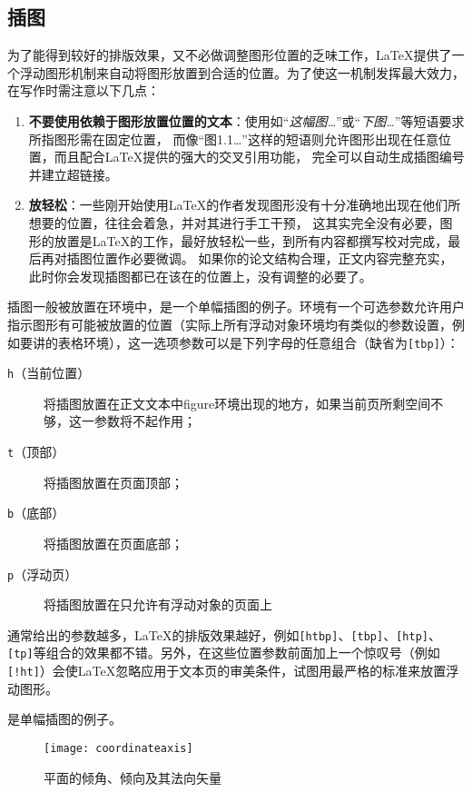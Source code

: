\subsection{插图}
为了能得到较好的排版效果，又不必做调整图形位置的乏味工作，\LaTeX 提供了一个浮动图形机制来自动将图形放置到合适的位置。为了使这一机制发挥最大效力，在写作时需注意以下几点：
\begin{enumerate}
	\item \textbf{不要使用依赖于图形放置位置的文本}：使用如“\emph{这幅图…}”或“\emph{下图…}”等短语要求所指图形需在固定位置，
	      而像“{\kaishu 图1.1…}”这样的短语则允许图形出现在任意位置，而且配合\LaTeX 提供的强大的交叉引用功能，
	      完全可以自动生成插图编号并建立超链接。
	\item \textbf{放轻松}：一些刚开始使用\LaTeX 的作者发现图形没有十分准确地出现在他们所想要的位置，往往会着急，并对其进行手工干预，
	      这其实完全没有必要，图形的放置是\LaTeX 的工作，最好放轻松一些，到所有内容都撰写校对完成，最后再对插图位置作必要微调。
	      如果你的论文结构合理，正文内容完整充实，此时你会发现插图都已在该在的位置上，没有调整的必要了。
\end{enumerate}

插图一般被放置在环境中，是一个单幅插图的例子。环境有一个可选参数允许用户指示图形有可能被放置的位置（实际上所有浮动对象环境均有类似的参数设置，例如要讲的表格环境），这一选项参数可以是下列字母的任意组合（缺省为\texttt{[tbp]}）：
\begin{description}
	\item[\texttt{h}（当前位置）] 将插图放置在正文文本中figure环境出现的地方，如果当前页所剩空间不够，这一参数将不起作用；
	\item[\texttt{t}（顶部）] 将插图放置在页面顶部；
	\item[\texttt{b}（底部）] 将插图放置在页面底部；
	\item[\texttt{p}（浮动页）] 将插图放置在只允许有浮动对象的页面上
\end{description}

通常给出的参数越多，\LaTeX 的排版效果越好，例如\texttt{[htbp]}、\texttt{[tbp]}、\texttt{[htp]}、\texttt{[tp]}等组合的效果都不错。另外，在这些位置参数前面加上一个惊叹号（例如\texttt{[!ht]}）会使\LaTeX 忽略应用于文本页的审美条件，试图用最严格的标准来放置浮动图形。

是单幅插图的例子。

\begin{figure}[htbp]
\centering
\texttt{[image: coordinateaxis]}
\caption{平面的倾角、倾向及其法向矢量}\label{fig:samples:coordinateaxis}
\end{figure}

